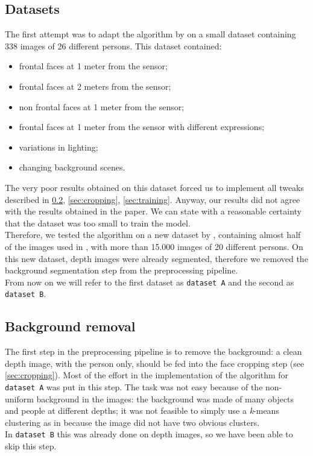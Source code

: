 \documentclass{article}
\begin{document}
\subsection{Datasets}\label{sec:datasets}
The first attempt was to adapt the algorithm by \citep{Hayat2016} on a small dataset containing 338 images of 26 different persons. This dataset contained:
\begin{itemize}
	\item frontal faces at 1 meter from the sensor;
	\item frontal faces at 2 meters from the sensor;
	\item non frontal faces at 1 meter from the sensor;
	\item frontal faces at 1 meter from the sensor with different expressions;
	\item variations in lighting;
	\item changing background scenes.
\end{itemize}
The very poor results obtained on this dataset forced us to implement all tweaks described in \ref{sec:background}, \ref{sec:cropping}, \ref{sec:training}. Anyway, our results did not agree with the results obtained in the paper. We can state with a reasonable certainty that the dataset was too small to train the model. \\
Therefore, we tested the algorithm on a new dataset by \citep{Fanelli2013}, containing almost half of the images used in \citep{Hayat2016}, with more than 15.000 images of 20 different persons. On this new dataset, depth images were already segmented, therefore we removed the background segmentation step from the preprocessing pipeline. \\
From now on we will refer to the first dataset as \verb|dataset A| and the second as \verb|dataset B|.

\subsection{Background removal} \label{sec:background}
The first step in the preprocessing pipeline is to remove the background: a clean depth image, with the person only, should be fed into the face cropping step (see \ref{sec:cropping}). Most of the effort in the implementation of the algorithm for \verb|dataset A| was put in this step. The task was not easy because of the non-uniform background in the images: the background was made of many objects and people at different depths; it was not feasible to simply use a \textit{k}-means clustering as in \cite{Hayat2016} because the image did not have two obvious clusters. \\
In \verb|dataset B| this was already done on depth images, so we have been able to skip this step. \\
\end{document}
